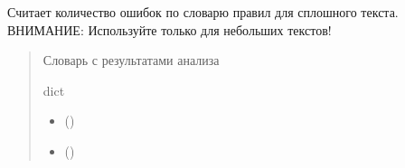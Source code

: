 \documentclass[a4paper,11pt,russian,openany,oneside]{sphinxmanual}
\begin{document}
\begin{savenotes}\begin{fulllineitems}
\label{\detokenize{processing_module:processing_module.calculate_data.make_text_processing}}
\pysigstartsignatures
\pysiglinewithargsret
{}
{\sphinxparamcomma {}}
{}
\pysigstopsignatures
\sphinxAtStartPar
Считает количество ошибок по словарю правил для сплошного текста.
ВНИМАНИЕ: Используйте только для небольших текстов!
\begin{quote}\begin{description}
\sphinxAtStartPar
Словарь с результатами анализа

\sphinxAtStartPar
dict

\begin{itemize}
\item {} 
\sphinxAtStartPar
{} ()

\item {} 
\sphinxAtStartPar
{} ()

\end{itemize}

\end{description}\end{quote}

\end{fulllineitems}\end{savenotes}

\end{document}
